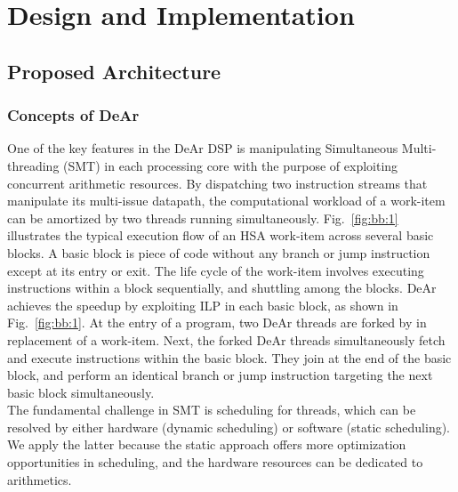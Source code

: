 \chapter{Design and Implementation}
\section{Proposed Architecture}
\subsection{Concepts of DeAr}
\indent 
One of the key features in the DeAr DSP is manipulating Simultaneous Multi-threading (SMT) in each processing core with the purpose of exploiting concurrent arithmetic resources.
By dispatching two instruction streams that manipulate its multi-issue datapath, 
the computational workload of a work-item can be amortized by two threads running simultaneously.
Fig.~\ref{fig:bb:1} illustrates the typical execution flow of an HSA work-item across several basic blocks.
A basic block is piece of code without any branch or jump instruction except at its entry or exit.
The life cycle of the work-item involves executing instructions within a block sequentially, and shuttling among the blocks.
DeAr achieves the speedup by exploiting ILP in each basic block, as shown in Fig.~\ref{fig:bb:1}. 
At the entry of a program, two DeAr threads are forked by in replacement of a work-item.
Next, the forked DeAr threads simultaneously fetch and execute instructions within the basic block.
They join at the end of the basic block, and perform an identical branch or jump instruction targeting the next basic block simultaneously.
\\\indent
The fundamental challenge in SMT is scheduling for threads, 
which can be resolved by either hardware (dynamic scheduling) or software (static scheduling).
We apply the latter because the static approach offers more optimization opportunities in scheduling, 
and the hardware resources can be dedicated to arithmetics.
\vspace{\textfig}

